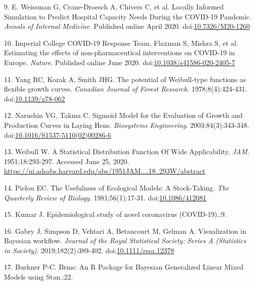 \documentclass[
]{article}
\begin{document}
\leavevmode\hypertarget{ref-e_weissman_locally_2020}{}%
9. E. Weissman G, Crane-Droesch A, Chivers C, et al. Locally Informed Simulation to Predict Hospital Capacity Needs During the COVID-19 Pandemic. \emph{Annals of Internal Medicine}. Published online April 2020. doi:\href{https://doi.org/10.7326/M20-1260}{10.7326/M20-1260}

\leavevmode\hypertarget{ref-imperial_college_covid-19_response_team_estimating_2020}{}%
10. Imperial College COVID-19 Response Team, Flaxman S, Mishra S, et al. Estimating the effects of non-pharmaceutical interventions on COVID-19 in Europe. \emph{Nature}. Published online June 2020. doi:\href{https://doi.org/10.1038/s41586-020-2405-7}{10.1038/s41586-020-2405-7}

\leavevmode\hypertarget{ref-yang_potential_1978}{}%
11. Yang RC, Kozak A, Smith JHG. The potential of Weibull-type functions as flexible growth curves. \emph{Canadian Journal of Forest Research}. 1978;8(4):424-431. doi:\href{https://doi.org/10.1139/x78-062}{10.1139/x78-062}

\leavevmode\hypertarget{ref-narushin_sigmoid_2003}{}%
12. Narushin VG, Takma C. Sigmoid Model for the Evaluation of Growth and Production Curves in Laying Hens. \emph{Biosystems Engineering}. 2003;84(3):343-348. doi:\href{https://doi.org/10.1016/S1537-5110(02)00286-6}{10.1016/S1537-5110(02)00286-6}

\leavevmode\hypertarget{ref-weibull_statistical_1951}{}%
13. Weibull W. A Statistical Distribution Function Of Wide Applicability. \emph{JAM}. 1951;18:293-297. Accessed June 25, 2020. \url{https://ui.adsabs.harvard.edu/abs/1951JAM....18..293W/abstract}

\leavevmode\hypertarget{ref-pielou_usefulness_1981}{}%
14. Pielou EC. The Usefulness of Ecological Models: A Stock-Taking. \emph{The Quarterly Review of Biology}. 1981;56(1):17-31. doi:\href{https://doi.org/10.1086/412081}{10.1086/412081}

\leavevmode\hypertarget{ref-kumar_epidemiological_nodate}{}%
15. Kumar J. Epidemiological study of novel coronavirus (COVID-19).:9.

\leavevmode\hypertarget{ref-gabry_visualization_2019}{}%
16. Gabry J, Simpson D, Vehtari A, Betancourt M, Gelman A. Visualization in Bayesian workflow. \emph{Journal of the Royal Statistical Society: Series A (Statistics in Society)}. 2019;182(2):389-402. doi:\href{https://doi.org/10.1111/rssa.12378}{10.1111/rssa.12378}

\leavevmode\hypertarget{ref-burkner_brms_nodate}{}%
17. Burkner P-C. Brms: An R Package for Bayesian Generalized Linear Mixed Models using Stan.:22.
\end{document}
